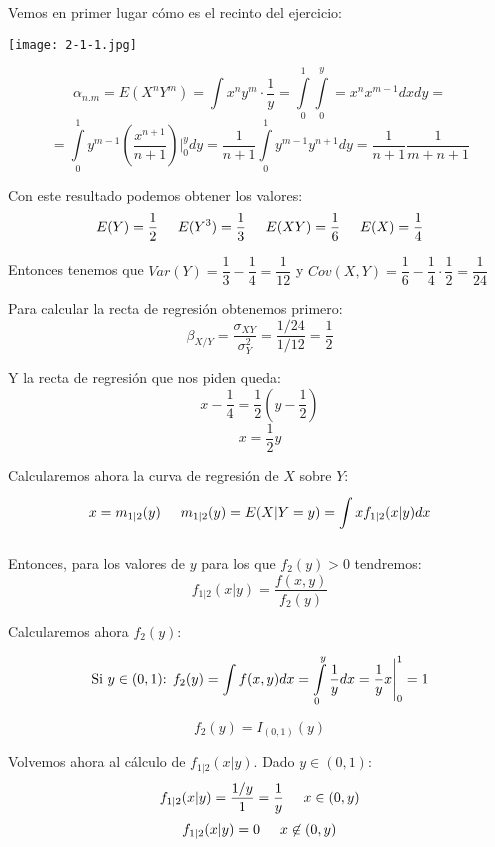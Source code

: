 \documentclass[openany]{book}
\begin{document}
\begin{exercise}
    $  $\\ 
    Vemos en primer lugar cómo es el recinto del ejercicio:
    \begin{center}
        \texttt{[image: 2-1-1.jpg]}
        
    \end{center}
    
    $$ \alpha_{n.m} = E(X^{n}Y^{m}) = \int\limits_{}^{}x^{n}y^{m} \cdot  \dfrac{1}{y} = \int\limits_{0}^{1}\int\limits_{0}^{y}  = x^{n}x^{m-1}dxdy  = $$ 
    $$= \int\limits_{0}^{1} y ^{m-1} \left( \dfrac{x^{n+1}}{n+1} \right) \Biggr|_{0}^{y} dy = \dfrac{1}{n+1} \int\limits_{0}^{1} y^{m-1}y^{n+1}dy = \dfrac{1}{n+1} \dfrac{1}{m+n+1} $$

    Con este resultado podemos obtener los valores:
    $$ E(Y) = \dfrac{1}{2} \hspace{5mm} E(Y^3) = \dfrac{1}{3} \hspace{5mm} E(XY) = \dfrac{1}{6} \hspace{5mm} E(X) = \dfrac{1}{4} $$
    
    Entonces tenemos que $ Var(Y) = \dfrac{1}{3}-\dfrac{1}{4} = \dfrac{1}{12} $ y $ Cov(X,Y) = \dfrac{1}{6}-\dfrac{1}{4}\cdot \dfrac{1}{2} = \dfrac{1}{24} $

    Para calcular la recta de regresión obtenemos primero:
    $$ \beta_{X/Y} = \dfrac{\sigma_{XY}}{\sigma_{Y}^2} = \dfrac{1/24}{1/12} = \dfrac{1}{2} $$
    
    Y la recta de regresión que nos piden queda:
    $$ x - \dfrac{1}{4} = \dfrac{1}{2} \left( y-\dfrac{1}{2} \right) $$
    $$ x = \dfrac{1}{2}y $$

    Calcularemos ahora la curva de regresión de $ X $ sobre $ Y $:
    $$  x = m_{1|2}(y) \hspace{5mm} m_{1|2}(y) = E(X|Y=y) = \int\limits_{}^{}x f_{1|2}(x|y)dx $$

    Entonces, para los valores de $ y $ para los que $ f_{2}(y)>0 $ tendremos:
    $$ f_{1|2}(x|y) = \dfrac{f(x,y)}{f_{2}(y)} $$

    Calcularemos ahora $ f_{2}(y) $:

    $$\text{Si $ y \in (0,1)$: }  f_{2}(y) = \int\limits_{}^{}f(x,y)dx = \int\limits_{0}^{y} \dfrac{1}{y}dx = \dfrac{1}{y}x \Biggr|_{0}^{1} = 1 $$


    $$ f_{2}(y) = I_{(0,1)}(y) $$

    Volvemos ahora al cálculo de $ f_{1|2}(x|y) $. Dado $ y \in (0,1) $:
    $$ f_{1|2}(x|y) = \dfrac{1/y}{1} = \dfrac{1}{y} \hspace{5mm} x \in (0,y) $$
    $$ f_{1|2}(x|y) = 0 \hspace{5mm} x \not  \in (0,y) $$


\end{exercise}
\end{document}
